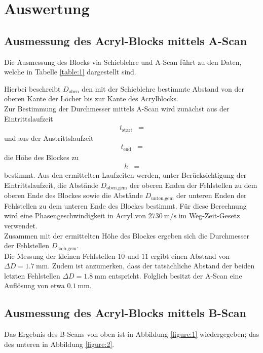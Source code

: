 \section{Auswertung}
\label{sec:Auswertung}

\subsection{Ausmessung des Acryl-Blocks mittels A-Scan}

Die Ausmessung des Blocks via Schieblehre und A-Scan führt zu den Daten, welche in Tabelle \ref{table:1} dargestellt sind.

Hierbei beschreibt $D_\text{oben}$ den mit der Schieblehre bestimmte Abstand von der oberen Kante der Löcher bis zur Kante des Acrylblocks.\\
Zur Bestimmung der Durchmesser mittels A-Scan wird zunächst aus der Eintrittslaufzeit
\begin{align*}
  t_\text{start} &= 
\end{align*}
und aus der Austrittslaufzeit
\begin{align*}
  t_\text{end} &= 
\end{align*}
die Höhe des Blockes zu
\begin{align*}
  h &= 
\end{align*}
bestimmt.
Aus den ermittelten Laufzeiten werden, unter Berücksichtigung der Eintrittslaufzeit, die Abstände $D_\text{oben,gem}$ der oberen Enden der Fehlstellen zu dem oberen Ende des Blockes sowie die Abstände $D_\text{unten,gem}$ der unteren Enden der Fehlstellen zu dem unteren Ende des Blockes bestimmt.
Für diese Berechnung wird eine Phasengeschwindigkeit in Acryl von $\SI{2730}{\metre\per\second}$ im Weg-Zeit-Gesetz verwendet. \cite{schall}\\
Zusammen mit der ermittelten Höhe des Blockes ergeben sich die Durchmesser der Fehlstellen $D_\text{loch,gem}$.\\
Die Messung der kleinen Fehlstellen $10$ und $11$ ergibt einen Abstand von $\Delta D = \SI{1.7}{\milli\metre}$.
Zudem ist anzumerken, dass der tatsächliche Abstand der beiden letzten Fehlstellen $\Delta D = \SI{1.8}{\milli\metre}$ entspricht.
Folglich besitzt der A-Scan eine Auflösung von etwa $\SI{0.1}{\milli\metre}$.\\

\subsection{Ausmessung des Acryl-Blocks mittels B-Scan}
Das Ergebnis des B-Scans von oben ist in Abbildung \ref{figure:1} wiedergegeben; das des unteren in Abbildung \ref{figure:2}.

